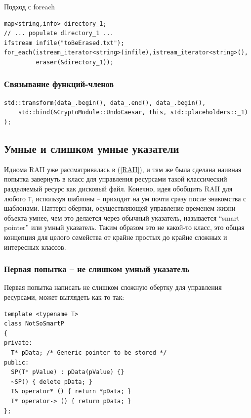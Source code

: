 \documentclass[a4paper,12pt,oneside]{article}
\begin{document}
Подход с foreach

\begin{lstlisting}
map<string,info> directory_1;
// ... populate directory_1 ...
ifstream infile("toBeErased.txt");
for_each(istream_iterator<string>(infile),istream_iterator<string>(),
         eraser(&directory_1));
\end{lstlisting}

\subsubsection{Связывание функций-членов}

\begin{lstlisting}
std::transform(data_.begin(), data_.end(), data_.begin(), 
    std::bind(&CryptoModule::UndoCaesar, this, std::placeholders::_1)
);
\end{lstlisting}

\pagebreak
\subsection{Умные и слишком умные указатели}\label{SmartPointers}

Идиома RAII уже рассматривалась в (\ref{RAII}), и там же была сделана наивная попытка завернуть в класс для управления ресурсами такой классический разделяемый ресурс как дисковый файл. Конечно, идея обобщить RAII для любого \lstinline!T!, используя шаблоны -- приходит на ум почти сразу после знакомства с шаблонами. Паттерн обертки, осуществляющей управление временем жизни объекта умнее, чем это делается через обычный указатель, называется ``smart pointer'' или умный указатель. Таким образом это не какой-то класс, это общая концепция для целого семейства от крайне простых до крайне сложных и интересных классов.

\subsubsection{Первая попытка -- не слишком умный указатель}

Первая попытка написать не слишком сложную обертку для управления ресурсами, может выглядеть как-то так:

\begin{lstlisting}
template <typename T> 
class NotSoSmartP
{
private:
  T* pData; /* Generic pointer to be stored */
public:
  SP(T* pValue) : pData(pValue) {}
  ~SP() { delete pData; }
  T& operator* () { return *pData; }
  T* operator-> () { return pData; }
};
\end{lstlisting}
\end{document}
